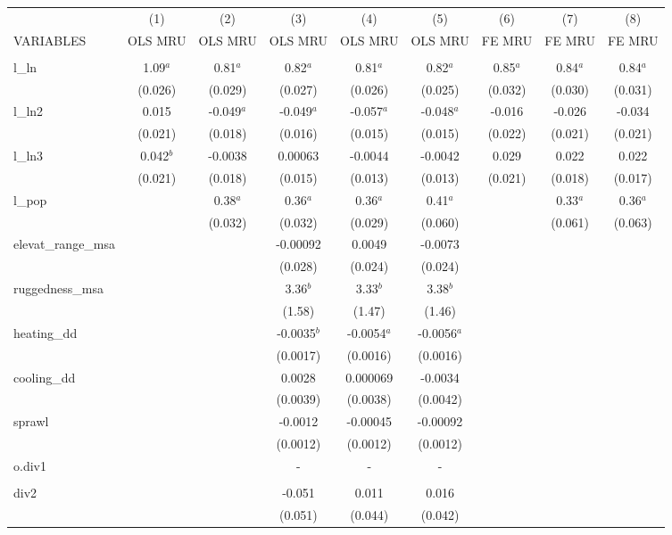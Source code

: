 \documentclass[]{article}
\begin{document}
\begin{tabular}{lcccccccc} \hline
 & (1) & (2) & (3) & (4) & (5) & (6) & (7) & (8) \\
VARIABLES & OLS MRU & OLS MRU & OLS MRU & OLS MRU & OLS MRU & FE MRU & FE MRU & FE MRU \\ \hline
 &  &  &  &  &  &  &  &  \\
l\_ln & 1.09$^a$ & 0.81$^a$ & 0.82$^a$ & 0.81$^a$ & 0.82$^a$ & 0.85$^a$ & 0.84$^a$ & 0.84$^a$ \\
 & (0.026) & (0.029) & (0.027) & (0.026) & (0.025) & (0.032) & (0.030) & (0.031) \\
l\_ln2 & 0.015 & -0.049$^a$ & -0.049$^a$ & -0.057$^a$ & -0.048$^a$ & -0.016 & -0.026 & -0.034 \\
 & (0.021) & (0.018) & (0.016) & (0.015) & (0.015) & (0.022) & (0.021) & (0.021) \\
l\_ln3 & 0.042$^b$ & -0.0038 & 0.00063 & -0.0044 & -0.0042 & 0.029 & 0.022 & 0.022 \\
 & (0.021) & (0.018) & (0.015) & (0.013) & (0.013) & (0.021) & (0.018) & (0.017) \\
l\_pop &  & 0.38$^a$ & 0.36$^a$ & 0.36$^a$ & 0.41$^a$ &  & 0.33$^a$ & 0.36$^a$ \\
 &  & (0.032) & (0.032) & (0.029) & (0.060) &  & (0.061) & (0.063) \\
elevat\_range\_msa &  &  & -0.00092 & 0.0049 & -0.0073 &  &  &  \\
 &  &  & (0.028) & (0.024) & (0.024) &  &  &  \\
ruggedness\_msa &  &  & 3.36$^b$ & 3.33$^b$ & 3.38$^b$ &  &  &  \\
 &  &  & (1.58) & (1.47) & (1.46) &  &  &  \\
heating\_dd &  &  & -0.0035$^b$ & -0.0054$^a$ & -0.0056$^a$ &  &  &  \\
 &  &  & (0.0017) & (0.0016) & (0.0016) &  &  &  \\
cooling\_dd &  &  & 0.0028 & 0.000069 & -0.0034 &  &  &  \\
 &  &  & (0.0039) & (0.0038) & (0.0042) &  &  &  \\
sprawl &  &  & -0.0012 & -0.00045 & -0.00092 &  &  &  \\
 &  &  & (0.0012) & (0.0012) & (0.0012) &  &  &  \\
o.div1 &  &  & - & - & - &  &  &  \\
 &  &  &  &  &  &  &  &  \\
div2 &  &  & -0.051 & 0.011 & 0.016 &  &  &  \\
 &  &  & (0.051) & (0.044) & (0.042) &  &  &  \\

\end{tabular}
\end{document}
